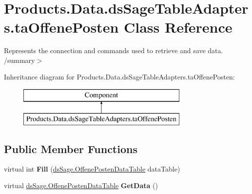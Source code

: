\hypertarget{class_products_1_1_data_1_1ds_sage_table_adapters_1_1ta_offene_posten}{}\section{Products.\+Data.\+ds\+Sage\+Table\+Adapters.\+ta\+Offene\+Posten Class Reference}
\label{class_products_1_1_data_1_1ds_sage_table_adapters_1_1ta_offene_posten}


Represents the connection and commands used to retrieve and save data. /summary$>$  


Inheritance diagram for Products.\+Data.\+ds\+Sage\+Table\+Adapters.\+ta\+Offene\+Posten\+:\begin{figure}[H]
\begin{center}
\leavevmode
\includegraphics[height=2.000000cm]{class_products_1_1_data_1_1ds_sage_table_adapters_1_1ta_offene_posten}
\end{center}
\end{figure}
\subsection*{Public Member Functions}
\begin{DoxyCompactItemize}
\item 
virtual int {\bfseries Fill} (\hyperlink{class_products_1_1_data_1_1ds_sage_1_1_offene_posten_data_table}{ds\+Sage.\+Offene\+Posten\+Data\+Table} data\+Table)\hypertarget{class_products_1_1_data_1_1ds_sage_table_adapters_1_1ta_offene_posten_ad7a46e334851dc805c61258cb3f1420f}{}\label{class_products_1_1_data_1_1ds_sage_table_adapters_1_1ta_offene_posten_ad7a46e334851dc805c61258cb3f1420f}

\item 
virtual \hyperlink{class_products_1_1_data_1_1ds_sage_1_1_offene_posten_data_table}{ds\+Sage.\+Offene\+Posten\+Data\+Table} {\bfseries Get\+Data} ()\hypertarget{class_products_1_1_data_1_1ds_sage_table_adapters_1_1ta_offene_posten_aaa41ad0991e9bc2b4865bae4b4a0550f}{}\label{class_products_1_1_data_1_1ds_sage_table_adapters_1_1ta_offene_posten_aaa41ad0991e9bc2b4865bae4b4a0550f}

\end{DoxyCompactItemize}
